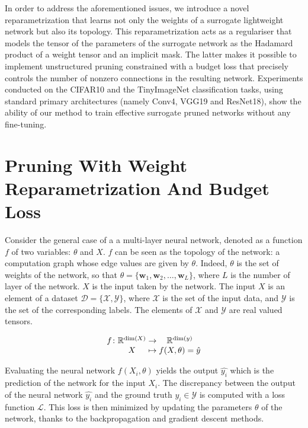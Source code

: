In order to address the aforementioned issues, we introduce a novel
reparametrization that learns not only the weights of a surrogate lightweight
network but also its topology. This reparametrization acts as a regulariser that
models the tensor of the parameters of the surrogate network as the Hadamard
product of a weight tensor and an implicit mask. The latter makes it possible to
implement unstructured pruning constrained with a budget loss that precisely
controls the number of nonzero connections in the resulting network. Experiments
conducted on the CIFAR10 and the TinyImageNet classification tasks, using
standard primary architectures (namely Conv4, VGG19 and ResNet18), show the
ability of our method to train effective surrogate pruned networks without any
fine-tuning.

\section{Pruning With Weight Reparametrization And Budget Loss}

Consider the general case of a a multi-layer neural network, denoted as a
function $f$ of two variables: $\theta$ and $X$. $f$ can be seen as the topology
of the network: a computation graph whose edge values are given by $\theta$.
Indeed, $\theta$ is the set of weights of the network, so that $\theta =
\{\mathbf{w}_1, \mathbf{w}_2, \ldots, \mathbf{w}_L\}$, where $L$ is the number
of layer of the network. $X$ is the input taken by the network. The input $X$ is
an element of a dataset $\mathcal{D}=\{ \mathcal{X}, \mathcal{Y} \}$, where
$\mathcal{X}$ is the set of the input data, and $\mathcal{Y}$ is the set of the
corresponding labels. The elements of $\mathcal{X}$ and $\mathcal{Y}$ are real
valued tensors.

\begin{equation}
    \begingroup
  \setlength\arraycolsep{0pt}
  f \colon\begin{array}[t]{c >{{}}c<{{}} c}
             \mathbb{R}^{\dim (X)} & \to & \mathbb{R}^{\dim (y)} \\ 
             X & \mapsto & f(X, \theta) = \hat{y} 
          \end{array}
  \endgroup
\end{equation}

Evaluating the neural network $f(X_i, \theta)$ yields the output $\hat{y_i}$
which is the prediction of the network for the input $X_i$. The discrepancy
between the output of the neural network $\hat{y_i}$ and the ground truth $y_i
\in \mathcal{Y}$ is computed with a loss function $\mathcal{L}$.  This loss is
then minimized by updating the parameters $\theta$ of the network, thanks to the
backpropagation \cite{rumelhart1985learning,rumelhart1986learning} and gradient
descent methods.\\

